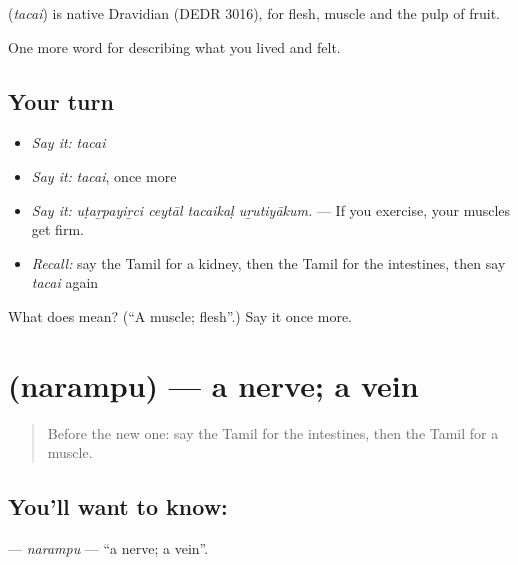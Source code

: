 \begin{cousinweb}
\textbf{} (\emph{tacai}) is native Dravidian (DEDR 3016), for flesh, muscle and the pulp of fruit.
\end{cousinweb}

\begin{grammarlens}[title={What you've built}]
One more word for describing what you lived and felt.
\end{grammarlens}

\subsection*{Your turn}
\begin{itemize}
\raggedright
  \item \emph{Say it:} \emph{tacai}
  \item \emph{Say it:} \emph{tacai}, once more
  \item \emph{Say it:} \emph{uṭaṟpayiṟci ceytāl tacaikaḷ uṟutiyākum.} — If you exercise, your muscles get firm.
  \item \emph{Recall:} say the Tamil for a kidney, then the Tamil for the intestines, then say \emph{tacai} again
\end{itemize}

\begin{tcolorbox}[breakable,colback=teal!4,colframe=teal!35!black,title={Before you move on}]
What does  mean? (\textquotedblleft{}A muscle; flesh\textquotedblright{}.) Say it once more.
\end{tcolorbox}
\section[\texorpdfstring{\ta{நரம்பு} (narampu)}{நரம்பு (narampu)}]{ (narampu) — a nerve; a vein}

\label{lesson:TA-C479-narampu}



\begin{quote}
Before the new one: say the Tamil for the intestines, then the Tamil for a muscle.
\end{quote}

\subsection*{You'll want to know: }
\textbf{} — \emph{narampu} — \textquotedblleft{}a nerve; a vein\textquotedblright{}.

